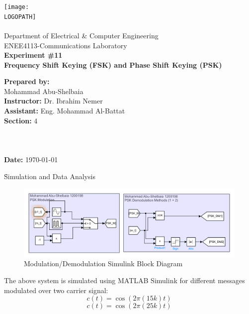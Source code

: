 \documentclass[12pt]{article}
\def \LOGOPATH {assets/birzeit-logo.png}
\def \DEPARTEMENT {Department of Electrical \& Computer Engineering}
\def \COURSENUM {ENEE4113}
\def \COURSENAME {Communications Laboratory}
\def \REPORTTITLE {Frequency Shift Keying (FSK) and Phase Shift Keying (PSK)}
\def \STUDENTNAME {Mohammad Abu-Shelbaia}
\def \STUDENTID {1200198}
\def \INSTRUCTOR {Dr. Ibrahim Nemer}
\def \ASSISTANT {Eng. Mohammad Al-Battat}
\def \REPORTNUM {11}
\begin{document}

\begin{titlepage}
    \vfill
    \begin{center}
        \texttt{[image: \\LOGOPATH]} \\
        \hfill \\
        \Large{\DEPARTEMENT} \\
        \Large{\COURSENUM\;-\;\COURSENAME} \\
        \vfill
        \textbf{\LARGE{Experiment \#\REPORTNUM}} \\
        \textbf{\LARGE{\REPORTTITLE}}
    \end{center}
    \vfill
    \begin{flushleft}
        \Large{\textbf{Prepared by:}\\ \STUDENTNAME\quad\STUDENTID} \\

        \Large{\textbf{Instructor:} \INSTRUCTOR} \\
        \Large{\textbf{Assistant:} \ASSISTANT} \\
        \Large{\textbf{Section:} 4}\\
        \LARGE{\textbf{ }}\\
        \LARGE{\textbf{ }}\\
        \LARGE{\textbf{ }}\\
        \Large{\textbf{Date:} \today}\\
    \end{flushleft}
    \vfill
\end{titlepage}


\tableofcontents
\clearpage
\setlength{\parskip}{\baselineskip}%
\listoffigures
\clearpage
{}
\h{Simulation and Data Analysis}
\begin{figure}[H]
    \centering
    \includegraphics[width=1\textwidth]{assets//main/2023-08-27-16-56-44.png}
    \caption{Modulation/Demodulation Simulink Block Diagram}
\end{figure}
The above system is simulated using MATLAB Simulink for different messages modulated over two carrier signal:
\begin{equation}
    c(t) = \cos(2\pi(15k)t)
\end{equation}
\begin{equation}
    c(t) = \cos(2\pi(25k)t)
\end{equation}
\end{document}
